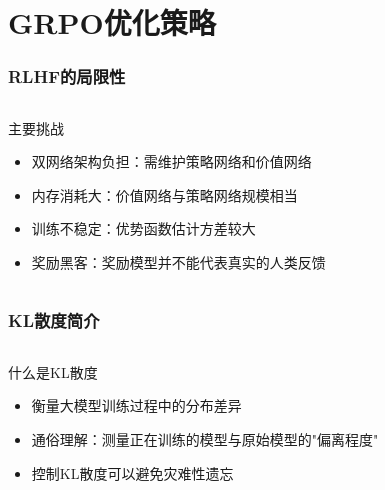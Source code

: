 \documentclass[10pt,aspectratio=169]{beamer}
\begin{document}
\section{GRPO优化策略}
\begin{frame}
    \frametitle{RLHF的局限性}
    \begin{columns}[T]
        \begin{alertblock}{主要挑战}
            \begin{itemize}
                \item 双网络架构负担：需维护策略网络和价值网络
                \item 内存消耗大：价值网络与策略网络规模相当
                \item 训练不稳定：优势函数估计方差较大
                \item 奖励黑客：奖励模型并不能代表真实的人类反馈
            \end{itemize}
        \end{alertblock}
    \end{columns}
\end{frame}

\begin{frame}
    \frametitle{KL散度简介}
    \begin{columns}[T]
        \begin{block}{什么是KL散度}
            \begin{itemize}
                \item 衡量大模型训练过程中的分布差异       
                \item 通俗理解：测量正在训练的模型与原始模型的"偏离程度"
                \item 控制KL散度可以避免灾难性遗忘
            \end{itemize}
        \end{block}
        
    \end{columns}
\end{frame}
\end{document}
